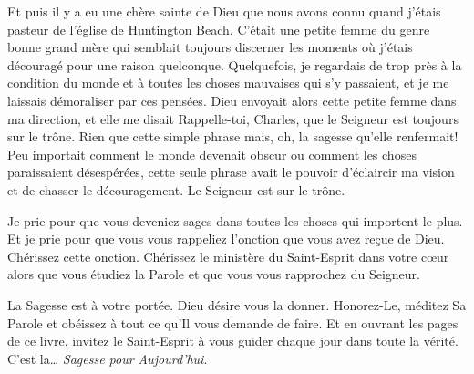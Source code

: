 Et puis il y a eu une chère sainte de Dieu que nous avons connu quand
 j'étais pasteur de l'église de Huntington Beach.
 C'était une petite femme du genre bonne grand mère qui semblait
 toujours discerner les moments où j'étais découragé
 pour une raison quelconque. Quelquefois, je regardais de trop près à la
 condition du monde et à toutes les choses mauvaises qui s'y passaient,
 et je me laissais démoraliser par ces pensées.
 Dieu envoyait alors cette petite femme dans ma direction,
 et elle me disait\frcolon{} \Og Rappelle-toi, Charles, que le Seigneur est toujours
 sur le trône. \Fg{}
 Rien que cette simple phrase mais, oh, la sagesse qu'elle renfermait!
 Peu importait comment le monde devenait obscur ou comment les choses
 paraissaient désespérées, cette seule phrase avait le pouvoir d'éclaircir
 ma vision et de chasser le découragement.
 \Og Le Seigneur est sur le trône. \Fg{}

Je prie pour que vous deveniez sages dans toutes les choses qui importent
 le plus. Et je prie pour que vous vous rappeliez l'onction que vous avez
 re\c{c}ue de Dieu. Chérissez cette onction. Chérissez le ministère du
 Saint-Esprit dans votre c\oe{}ur alors que vous étudiez la Parole
 et que vous vous rapprochez du Seigneur.

La Sagesse est à votre portée. Dieu désire vous la donner.
 Honorez-Le,
 méditez Sa Parole et obéissez à tout ce qu'Il vous demande de faire.
 Et en ouvrant les pages de ce livre, invitez le Saint-Esprit à vous guider
 chaque jour dans toute la vérité.
 C'est la\dots{} \emph{Sagesse pour Aujourd'hui}.

\signature{Chuck Smith}

